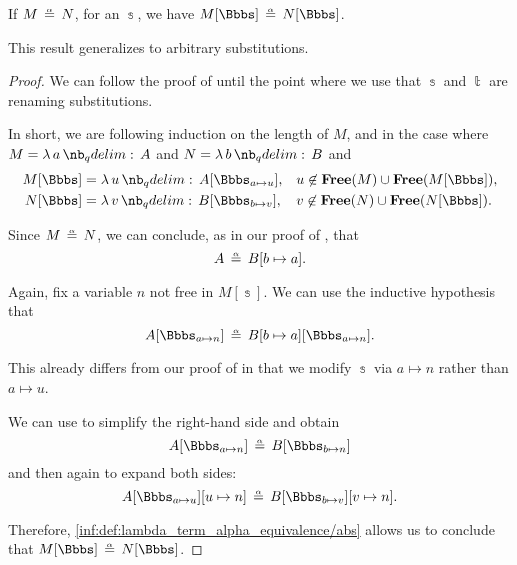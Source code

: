 \begin{proposition}\label{thm:substitution_on_alpha_equivalent_terms}
  If \( M \aequiv N \), for an \hyperref[def:lambda_term_substitution]{} \( \Bbbs \), we have \( M[\Bbbs] \aequiv N[\Bbbs] \).
\end{proposition}
\begin{comments}
  \item This result generalizes  to arbitrary substitutions.
\end{comments}
\begin{proof}
  We can follow the proof of  until the point where we use that \( \Bbbs \) and \( \Bbbt \) are renaming substitutions.

  In short, we are following induction on the length of \( M \), and in the case where \( M = \qabs a A \) and \( N = \qabs b B \) and
  \begin{align*}
    M[\Bbbs] &= \qabs u A[\Bbbs_{a \mapsto u}], &&u \not\in \op*{Free}(M) \cup \op*{Free}(M[\Bbbs]), \\
    N[\Bbbs] &= \qabs v B[\Bbbs_{b \mapsto v}], &&v \not\in \op*{Free}(N) \cup \op*{Free}(N[\Bbbs]).
  \end{align*}

  Since \( M \aequiv N \), we can conclude, as in our proof of , that
  \begin{equation*}
    A \aequiv B[b \mapsto a].
  \end{equation*}

  Again, fix a variable \( n \) not free in \( M[\Bbbs] \). We can use the inductive hypothesis that
  \begin{equation*}
    A[\Bbbs_{a \mapsto n}] \aequiv B[b \mapsto a][\Bbbs_{a \mapsto n}].
  \end{equation*}

  This already differs from our proof of  in that we modify \( \Bbbs \) via \( a \mapsto n \) rather than \( a \mapsto u \).

  We can use  to simplify the right-hand side and obtain
  \begin{equation*}
    A[\Bbbs_{a \mapsto n}] \aequiv B[\Bbbs_{b \mapsto n}]
  \end{equation*}
  and then again to expand both sides:
  \begin{equation*}
    A[\Bbbs_{a \mapsto u}][u \mapsto n] \aequiv B[\Bbbs_{b \mapsto v}][v \mapsto n].
  \end{equation*}

  Therefore, \ref{inf:def:lambda_term_alpha_equivalence/abs} allows us to conclude that \( M[\Bbbs] \aequiv N[\Bbbs] \).
\end{proof}

